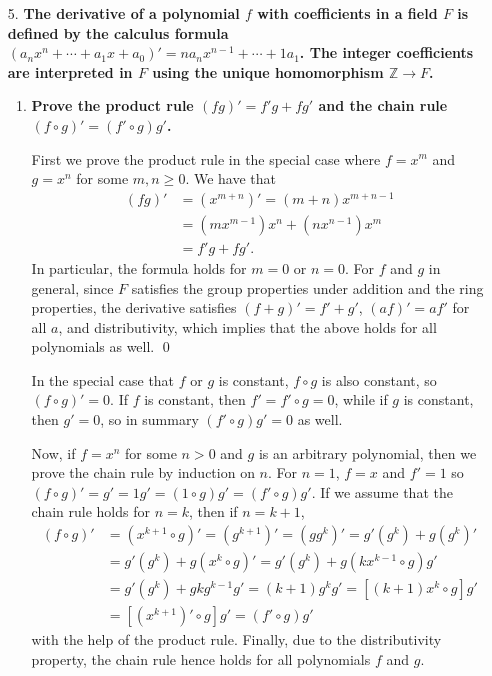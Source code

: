 \documentclass[a4paper,12pt]{article}
\begin{document}
\begin{enumerate}
    \item[5.]
        \boldmath
        \textbf{The derivative of a polynomial $f$ with coefficients in a field $F$ is defined by the calculus formula $(a_n x^n + \cdots + a_1 x + a_0)' = na_n x^{n - 1} + \cdots + 1a_1$. The integer coefficients are interpreted in $F$ using the unique homomorphism $\mathbb{Z} \to F$.}
        \unboldmath
        \begin{enumerate}
            \item
                \boldmath
                \textbf{Prove the product rule $(fg)' = f'g + fg'$ and the chain rule $(f \circ g)' = (f' \circ g)g'$.} \par
                \unboldmath
                First we prove the product rule in the special case where $f = x^m$ and $g = x^n$ for some $m, n \geq 0$. We have that
                \begin{align*}
                    (fg)' &= (x^{m + n})' = (m + n) x^{m + n - 1} \\
                    &= (mx^{m - 1}) x^n + (nx^{n - 1}) x^m \\
                    &= f'g + fg'.
                \end{align*}
                In particular, the formula holds for $m = 0$ or $n = 0$. For $f$ and $g$ in general, since $F$ satisfies the group properties under addition and the ring properties, the derivative satisfies $(f + g)' = f' + g'$, $(af)' = af'$ for all $a$, and distributivity, which implies that the above holds for all polynomials as well. \qed \par
                In the special case that $f$ or $g$ is constant, $f \circ g$ is also constant, so $(f \circ g)' = 0$. If $f$ is constant, then $f' = f' \circ g = 0$, while if $g$ is constant, then $g' = 0$, so in summary $(f' \circ g)g' = 0$ as well. \par
                Now, if $f = x^n$ for some $n > 0$ and $g$ is an arbitrary polynomial, then we prove the chain rule by induction on $n$. For $n = 1$, $f = x$ and $f' = 1$ so $(f \circ g)' = g' = 1g' = (1 \circ g)g' = (f' \circ g)g'$. If we assume that the chain rule holds for $n = k$, then if $n = k + 1$,
                \begin{align*}
                    (f \circ g)' &= (x^{k + 1} \circ g)' = (g^{k + 1})' = (gg^k)' = g'(g^k) + g(g^k)' \\
                    &= g'(g^k) + g(x^k \circ g)' = g'(g^k) + g(kx^{k - 1} \circ g)g'\\
                    &= g'(g^k) + gkg^{k - 1}g' = (k + 1)g^k g' = [(k + 1)x^k \circ g] g' \\
                    &= [(x^{k + 1})' \circ g] g' = (f' \circ g) g'
                \end{align*}
                with the help of the product rule. Finally, due to the distributivity property, the chain rule hence holds for all polynomials $f$ and $g$.


\end{enumerate}
\end{enumerate}
\end{document}
